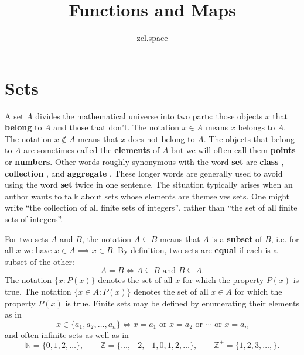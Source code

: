 \documentclass[10pt,a4paper,UTF8]{article}
\author{zcl.space}
\date{}
\title{Functions and Maps}
\begin{document}
\maketitle
\tableofcontents
{}

\section{Sets}
\label{sec:org024cc21}
A set \(A\) divides the mathematical universe into two parts:
those objects \(x\) that \textbf{belong} to \(A\) and those that don't.
The notation \(x\in A\) means \(x\) belongs to \(A\).
The notation \(x\notin A\) means that \(x\) does not belong to \(A\).
The objects that belong to \(A\) are sometimes called
the \textbf{elements} of \(A\) but we will often call them \textbf{points}
or \textbf{numbers}.
Other words  roughly synonymous with the word \textbf{set}
are \textbf{class} , \textbf{collection} , and \textbf{aggregate} .
These longer words are generally used to avoid
using the word \textbf{set}  twice in one sentence.  The situation typically
arises when an author wants to talk about sets whose elements are themselves
sets. One  might write ``the collection of all finite sets of integers'',
rather than ``the set of all finite sets of integers''.

For two sets \(A\) and \(B\),   the notation \(A\subseteq B\) means that \(A\) is a \textbf{subset}
of \(B\), i.e. for all \(x\) we have \(x\in A\implies x\in B\).
By definition, two sets are \textbf{equal} if each is a subset of the other:
$$
   A=B\iff A\subseteq B\mbox{ and } B\subseteq A.
$$
The notation \(\{x:P(x)\}\) denotes the set of all \(x\)
for which  the property \(P(x)\) is  true.
The notation \(\{x\in A:P(x)\}\) denotes the set of all \(x\in A\)
for which  the property \(P(x)\) is  true.
Finite sets may be defined by enumerating their elements as in
$$
   x\in\{a_1,a_2,\ldots,a_n\}\iff x=a_1 \mbox{ or } x=a_2 \mbox{ or } \cdots \mbox{ or } x=a_n
$$
and often infinite sets as well as in
$$
    \mathbb{N}=\{0,1,2,\ldots\}, \qquad \mathbb{Z}=\{\ldots,-2, -1,0,1,2,\ldots\},\qquad \mathbb{Z}^+=\{1,2,3,\ldots,\}.
$$
\end{document}
